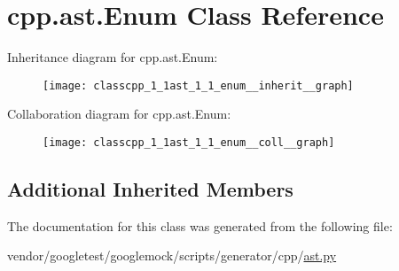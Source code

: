 \hypertarget{classcpp_1_1ast_1_1_enum}{}\section{cpp.\+ast.\+Enum Class Reference}
\label{classcpp_1_1ast_1_1_enum}


Inheritance diagram for cpp.\+ast.\+Enum\+:
\nopagebreak
\begin{figure}[H]
\begin{center}
\leavevmode
\texttt{[image: classcpp\_1\_1ast\_1\_1\_enum\_\_inherit\_\_graph]}
\end{center}
\end{figure}


Collaboration diagram for cpp.\+ast.\+Enum\+:
\nopagebreak
\begin{figure}[H]
\begin{center}
\leavevmode
\texttt{[image: classcpp\_1\_1ast\_1\_1\_enum\_\_coll\_\_graph]}
\end{center}
\end{figure}
\subsection*{Additional Inherited Members}


The documentation for this class was generated from the following file\+:\begin{DoxyCompactItemize}
\item 
vendor/googletest/googlemock/scripts/generator/cpp/\hyperlink{ast_8py}{ast.\+py}\end{DoxyCompactItemize}

